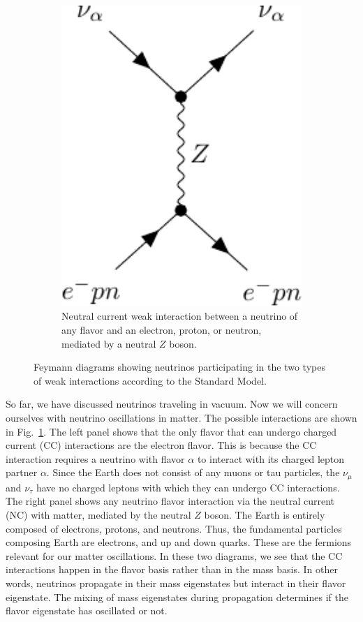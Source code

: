 \begin{figure}
\begin{subfigure}{0.3\textwidth}
        \includegraphics[width=1\textwidth]{figures/z-boson.pdf} 
        \caption{Neutral current weak interaction between a neutrino of any flavor and an electron, proton, or neutron,
        mediated by a neutral $Z$ boson.}
    \end{subfigure}
    \caption{Feymann diagrams showing neutrinos participating in the two types of weak interactions according to the Standard Model.}\label{fig:w_and_z}
\end{figure}
So far, we have discussed neutrinos traveling in vacuum. Now we will concern ourselves with neutrino oscillations in matter.
The possible interactions are shown in Fig.~\ref{fig:w_and_z}. The left panel shows that the only flavor that can undergo charged current (CC) 
interactions are the electron flavor. This is because the CC interaction requires a neutrino with flavor $\alpha$ to interact with its charged lepton
partner $\alpha$. Since the Earth does not consist of any muons or tau particles, the $\nu_\mu$ and $\nu_\tau$ have no charged leptons with which they can undergo CC interactions. 
The right panel shows any neutrino flavor interaction via the neutral current (NC) with matter, mediated by the neutral $Z$ boson. The Earth is entirely composed
of electrons, protons, and neutrons. Thus, the fundamental particles composing Earth are electrons, and up and down quarks. These are the
fermions relevant for our matter oscillations. In these two diagrams, we see that the CC interactions happen in the flavor basis rather than in the mass basis. In other words,
neutrinos propagate in their mass eigenstates but interact in their flavor eigenstate. The mixing of mass eigenstates during propagation
determines if the flavor eigenstate has oscillated or not.

